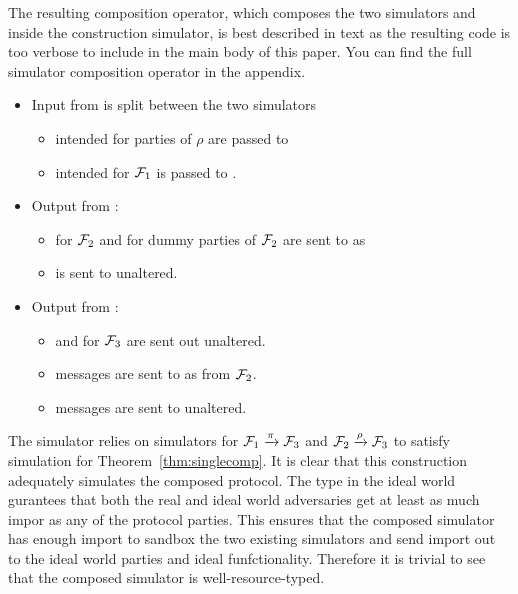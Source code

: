 The resulting composition operator, which composes the two simulators \SIM{\rho} and \SIM{\pi} inside the construction simulator, is best described in text as the resulting code is too verbose to include in the main body of this paper.
You can find the full simulator composition operator in the appendix.
\begin{itemize}
	\item Input from \Z is split between the two simulators
	\begin{itemize} 
		\item {} intended for parties of $\rho$ are passed to \SIM{\rho}
		\item {} intended for $\mathcal{F}_1$ is passed to \SIM{\pi}.
	\end{itemize}
	\item Output from \SIM{\pi}: 
	\begin{itemize}
		\item {} for $\mathcal{F}_2$ and  for dummy parties of $\mathcal{F}_2$ are sent to \SIM{\rho} as 
		\item {} is sent to \Z unaltered.
	\end{itemize}
	\item Output from \SIM{\rho}: 
	\begin{itemize}
		\item {} and  for $\mathcal{F}_3$ are sent out unaltered.
		\item {} messages are sent to \SIM{\pi} as  from $\mathcal{F}_2$.
		\item {} messages are sent to \Z unaltered.
	\end{itemize}
\end{itemize}
The simulator relies on simulators for $\mathcal{F}_1 \xrightarrow{\pi} \mathcal{F}_3$ and $\mathcal{F}_2 \xrightarrow{\rho} \mathcal{F}_3$ to satisfy simulation for Theorem~\ref{thm:singlecomp}.
It is clear that this construction adequately simulates the composed protocol. 
The type in the ideal world gurantees that both the real and ideal world adversaries get at least as much impor as any of the protocol parties. 
This ensures that the composed simulator has enough import to sandbox the two existing simulators and send import out to the ideal world parties and ideal funfctionality.
Therefore it is trivial to see that the composed simulator is well-resource-typed.

